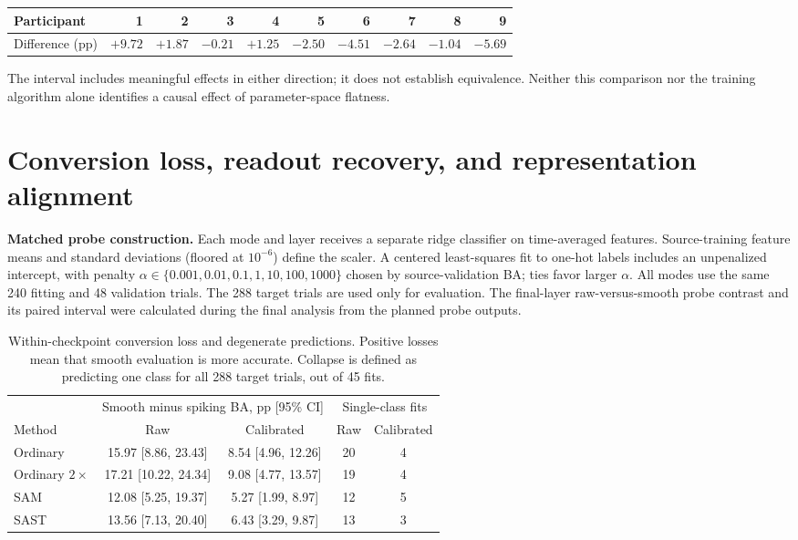 \documentclass[11pt,a4paper]{article}
\begin{document}
\begin{center}\small
\begin{tabular}{lrrrrrrrrr}
\toprule
Participant & 1 & 2 & 3 & 4 & 5 & 6 & 7 & 8 & 9 \\
\midrule
Difference (pp) & $+9.72$ & $+1.87$ & $-0.21$ & $+1.25$ & $-2.50$ & $-4.51$ & $-2.64$ & $-1.04$ & $-5.69$ \\
\bottomrule
\end{tabular}\end{center}
The interval includes meaningful effects in either direction; it does not
establish equivalence. Neither this comparison nor the training algorithm
alone identifies a causal effect of parameter-space flatness.

\clearpage
\section{Conversion loss, readout recovery, and representation alignment}

\textbf{Matched probe construction.} Each mode and layer receives a separate
ridge classifier on time-averaged features. Source-training feature means and
standard deviations (floored at $10^{-6}$) define the scaler. A centered
least-squares fit to one-hot labels includes an unpenalized intercept, with
penalty $\alpha\in\{0.001,0.01,0.1,1,10,100,1000\}$ chosen by source-validation
BA; ties favor larger $\alpha$. All modes use the same 240 fitting and 48
validation trials. The 288 target trials are used only for evaluation.
The final-layer raw-versus-smooth probe contrast and its paired interval
were calculated during the final analysis from the planned probe outputs.

\begin{table}[h]
\centering\small\setlength{\tabcolsep}{4pt}
\caption{Within-checkpoint conversion loss and degenerate predictions.
Positive losses mean that smooth evaluation is more accurate. Collapse is
defined as predicting one class for all 288 target trials, out of 45 fits.}
\begin{tabular}{lcccc}
\toprule
& \multicolumn{2}{c}{Smooth minus spiking BA, pp [95\% CI]}
& \multicolumn{2}{c}{Single-class fits} \\
\cmidrule(lr){2-3}\cmidrule(lr){4-5}
Method & Raw & Calibrated & Raw & Calibrated \\
\midrule
Ordinary & 15.97 [8.86, 23.43] & 8.54 [4.96, 12.26] & 20 & 4 \\
Ordinary $2\times$ & 17.21 [10.22, 24.34] & 9.08 [4.77, 13.57] & 19 & 4 \\
SAM & 12.08 [5.25, 19.37] & 5.27 [1.99, 8.97] & 12 & 5 \\
SAST & 13.56 [7.13, 20.40] & 6.43 [3.29, 9.87] & 13 & 3 \\
\bottomrule
\end{tabular}
\end{table}
\end{document}
